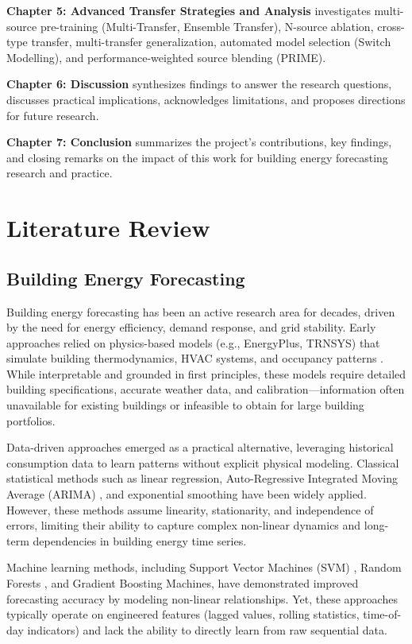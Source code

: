 \documentclass[12pt,a4paper]{report}
\begin{document}
\textbf{Chapter 5: Advanced Transfer Strategies and Analysis} investigates multi-source pre-training (Multi-Transfer, Ensemble Transfer), N-source ablation, cross-type transfer, multi-transfer generalization, automated model selection (Switch Modelling), and performance-weighted source blending (PRIME).

\textbf{Chapter 6: Discussion} synthesizes findings to answer the research questions, discusses practical implications, acknowledges limitations, and proposes directions for future research.

\textbf{Chapter 7: Conclusion} summarizes the project's contributions, key findings, and closing remarks on the impact of this work for building energy forecasting research and practice.

\chapter{Literature Review}

\section{Building Energy Forecasting}

Building energy forecasting has been an active research area for decades, driven by the need for energy efficiency, demand response, and grid stability. Early approaches relied on physics-based models (e.g., EnergyPlus, TRNSYS) that simulate building thermodynamics, HVAC systems, and occupancy patterns \cite{crawley2001energyplus}. While interpretable and grounded in first principles, these models require detailed building specifications, accurate weather data, and calibration—information often unavailable for existing buildings or infeasible to obtain for large building portfolios.

Data-driven approaches emerged as a practical alternative, leveraging historical consumption data to learn patterns without explicit physical modeling. Classical statistical methods such as linear regression, Auto-Regressive Integrated Moving Average (ARIMA) \cite{box2015time}, and exponential smoothing have been widely applied. However, these methods assume linearity, stationarity, and independence of errors, limiting their ability to capture complex non-linear dynamics and long-term dependencies in building energy time series.

Machine learning methods, including Support Vector Machines (SVM) \cite{dong2005applying}, Random Forests \cite{tso2014predicting}, and Gradient Boosting Machines, have demonstrated improved forecasting accuracy by modeling non-linear relationships. Yet, these approaches typically operate on engineered features (lagged values, rolling statistics, time-of-day indicators) and lack the ability to directly learn from raw sequential data.
\end{document}
